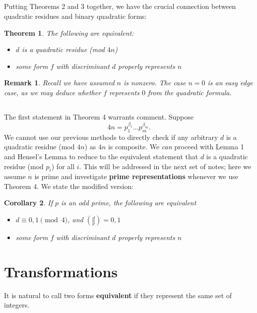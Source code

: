 \documentclass[12pt]{article}
\newtheorem{theorem}{Theorem}
\newtheorem{corollary}[theorem]{Corollary}
\newtheorem*{remark}{Remark}
\newcommand{\legendre}[2]{\genfrac{(}{)}{}{}{#1}{#2}}
\begin{document}
\subsection{}
Putting Theorems 2 and 3 together, we have the crucial connection between quadratic residues and binary quadratic forms:
\begin{theorem}
    The following are equivalent:
    \begin{itemize}
        \item $d$ is a quadratic residue (mod $4n$)
        \item some form $f$ with discriminant $d$ properly represents $n$
    \end{itemize}
\end{theorem}
\begin{remark}
    Recall we have assumed $n$ is nonzero. The case $n = 0$ is an easy edge case, as we may deduce whether $f$ represents $0$ from the quadratic formula.
\end{remark}

\subsection{}
The first statement in Theorem 4 warrants comment. Suppose
\begin{equation*}
    4n = p_{1}^{\beta_{1}}...p_{m}^{\beta_{m}}.
\end{equation*}
We cannot use our previous methods to directly check if any arbitrary $d$ is a quadratic residue (mod $4n$) as $4n$ is composite. We \textit{can} proceed with Lemma 1 and Hensel's Lemma to reduce to the equivalent statement that $d$ is a quadratic residue (mod $p_{i}$) for all $i$. This will be addressed in the next set of notes; here we assume $n$ is prime and investigate \textbf{prime representations} whenever we use Theorem 4. We state the modified version:
\begin{corollary}
    If $p$ is an odd prime, the following are equivalent
    \begin{itemize}
        \item $d \equiv 0, 1 \pmod{4}$, and $\legendre{d}{p} = 0, 1$
        \item some form $f$ with discriminant $d$ properly represents $n$
    \end{itemize}
\end{corollary}

\section{Transformations}
It is natural to call two forms \textbf{equivalent} if they represent the same set of integers. 
\end{document}
